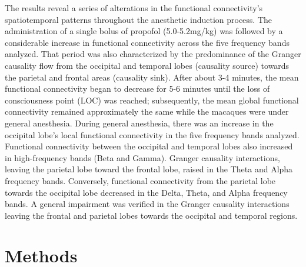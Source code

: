 \documentclass[twoside]{article}
\begin{document}
\begin{multicols}{2}
The results reveal a series of alterations in the functional connectivity's spatiotemporal patterns throughout the anesthetic induction process. The administration of a single bolus of propofol (5.0-5.2mg/kg) was followed by a considerable increase in functional connectivity across the five frequency bands analyzed. That period was also characterized by the predominance of the Granger causality flow from the occipital and temporal lobes (causality source) towards the parietal and frontal areas (causality sink). After about 3-4 minutes, the mean functional connectivity began to decrease for 5-6 minutes until the loss of consciousness point (LOC) was reached; subsequently, the mean global functional connectivity remained approximately the same while the macaques were under general anesthesia. During general anesthesia, there was an increase in the occipital lobe's local functional connectivity in the five frequency bands analyzed. Functional connectivity between the occipital and temporal lobes also increased in high-frequency bands (Beta and Gamma). Granger causality interactions, leaving the parietal lobe toward the frontal lobe, raised in the Theta and Alpha frequency bands. Conversely, functional connectivity from the parietal lobe towards the occipital lobe decreased in the Delta, Theta, and Alpha frequency bands. A general impairment was verified in the Granger causality interactions leaving the frontal and parietal lobes towards the occipital and temporal regions.


\section{Methods}



\end{multicols}
\end{document}
